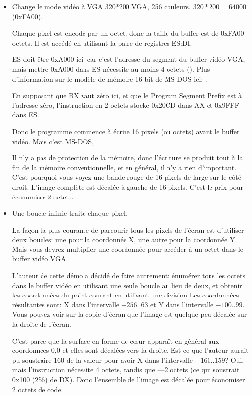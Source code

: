 \begin{itemize}
\item Change le mode vidéo à VGA 320*200 VGA, 256 couleurs. 
$320*200=64000$ (0xFA00). 

Chaque pixel est encodé par un octet, donc la taille du buffer est de 0xFA00 octets.
Il est accédé en utilisant la paire de registres ES:DI.

ES doit être 0xA000 ici, car c'est l'adresse du segment du buffer vidéo VGA, mais
mettre 0xA000 dans ES nécessite au moins 4 octets ().
Plus d'information sur le modèle de mémoire 16-bit de MS-DOS ici:
.


En supposant que BX vaut zéro ici, et que le Program Segment Prefix est à l'adresse
zéro, l'instruction en 2 octets  stocke 0x20CD dans AX et 0x9FFF
dans ES.

Donc le programme commence à écrire 16 pixels (ou octets) avant le buffer vidéo.
Mais c'est MS-DOS,

Il n'y a pas de protection de la mémoire, donc l'écriture se produit tout à la fin
de la mémoire conventionnelle, et en général, il n'y a rien d'important.
C'est pourquoi vous voyez une bande rouge de 16 pixels de large sur le côté droit.
L'image complète est décalée à gauche de 16 pixels.
C'est le prix pour économiser 2 octets.

\item Une boucle infinie traite chaque pixel.

La façon la plus courante de parcourir tous les pixels de l'écran est d'utiliser deux boucles:
une pour la coordonnée X, une autre pour la coordonnée Y.
Mais vous devrez multiplier une coordonnée pour accéder à un octet dans le buffer vidéo VGA.

L'auteur de cette démo a décidé de faire autrement: énumérer tous les octets dans
le buffer vidéo en utilisant une seule boucle au lieu de deux, et obtenir les coordonnées
du point courant en utilisant une division
Les coordonnées résultantes sont: X dans l'intervalle $-256..63$ et Y dans l'intervalle
$-100..99$.
Vous pouvez voir sur la copie d'écran que l'image est quelque peu décalée sur la
droite de l'écran.

C'est parce que la surface en forme de c\oe{}ur apparaît en général aux coordonnées
0,0 et elles sont décalées vers la droite.
Est-ce que l'auteur aurait pu soustraire 160 de la valeur pour avoir X dans l'intervalle
$-160..159$?
Oui, mais l'instruction  nécessite 4 octets, tandis que
---2 octets (ce qui soustrait 0x100 (256) de DX).
Donc l'ensemble de l'image est décalée pour économiser 2 octets de code.


\end{itemize}
